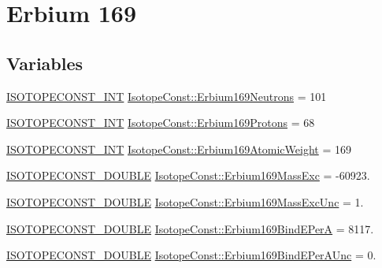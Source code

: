 \hypertarget{group___isotope_const-_erbium-_er169}{}\section{Erbium 169}
\label{group___isotope_const-_erbium-_er169}
\subsection*{Variables}
\begin{DoxyCompactItemize}
\item 
\mbox{\hyperlink{group___isotope_const-_macros_ga5f18360b3e99483a35c32d789e62621c}{I\+S\+O\+T\+O\+P\+E\+C\+O\+N\+S\+T\+\_\+\+I\+NT}} \mbox{\hyperlink{group___isotope_const-_erbium-_er169_gade30024f29e7146358888a586e740c61}{Isotope\+Const\+::\+Erbium169\+Neutrons}} = 101
\item 
\mbox{\hyperlink{group___isotope_const-_macros_ga5f18360b3e99483a35c32d789e62621c}{I\+S\+O\+T\+O\+P\+E\+C\+O\+N\+S\+T\+\_\+\+I\+NT}} \mbox{\hyperlink{group___isotope_const-_erbium-_er169_gaf844d2bd4989f7b0185fe29240b3eb0f}{Isotope\+Const\+::\+Erbium169\+Protons}} = 68
\item 
\mbox{\hyperlink{group___isotope_const-_macros_ga5f18360b3e99483a35c32d789e62621c}{I\+S\+O\+T\+O\+P\+E\+C\+O\+N\+S\+T\+\_\+\+I\+NT}} \mbox{\hyperlink{group___isotope_const-_erbium-_er169_gaf9b945375754ca2049227f93ab59fc8b}{Isotope\+Const\+::\+Erbium169\+Atomic\+Weight}} = 169
\item 
\mbox{\hyperlink{group___isotope_const-_macros_ga8f45a7272ce02c0b4c65c44636ed719a}{I\+S\+O\+T\+O\+P\+E\+C\+O\+N\+S\+T\+\_\+\+D\+O\+U\+B\+LE}} \mbox{\hyperlink{group___isotope_const-_erbium-_er169_gae4af7f3191c0d5ac8f4e275d887be88d}{Isotope\+Const\+::\+Erbium169\+Mass\+Exc}} = -\/60923.
\item 
\mbox{\hyperlink{group___isotope_const-_macros_ga8f45a7272ce02c0b4c65c44636ed719a}{I\+S\+O\+T\+O\+P\+E\+C\+O\+N\+S\+T\+\_\+\+D\+O\+U\+B\+LE}} \mbox{\hyperlink{group___isotope_const-_erbium-_er169_ga442b3b7036a0856859ed61b3665d874c}{Isotope\+Const\+::\+Erbium169\+Mass\+Exc\+Unc}} = 1.
\item 
\mbox{\hyperlink{group___isotope_const-_macros_ga8f45a7272ce02c0b4c65c44636ed719a}{I\+S\+O\+T\+O\+P\+E\+C\+O\+N\+S\+T\+\_\+\+D\+O\+U\+B\+LE}} \mbox{\hyperlink{group___isotope_const-_erbium-_er169_ga90d0386e969706b233848461a6b83a06}{Isotope\+Const\+::\+Erbium169\+Bind\+E\+PerA}} = 8117.
\item 
\mbox{\hyperlink{group___isotope_const-_macros_ga8f45a7272ce02c0b4c65c44636ed719a}{I\+S\+O\+T\+O\+P\+E\+C\+O\+N\+S\+T\+\_\+\+D\+O\+U\+B\+LE}} \mbox{\hyperlink{group___isotope_const-_erbium-_er169_ga395a73afd4d566a8de22e4d010439826}{Isotope\+Const\+::\+Erbium169\+Bind\+E\+Per\+A\+Unc}} = 0.

\end{DoxyCompactItemize}
